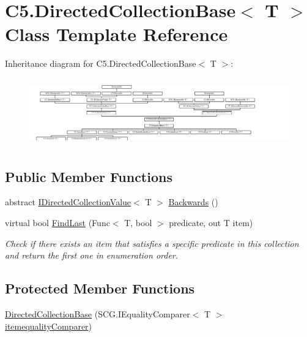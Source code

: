 \hypertarget{class_c5_1_1_directed_collection_base}{}\section{C5.\+Directed\+Collection\+Base$<$ T $>$ Class Template Reference}
\label{class_c5_1_1_directed_collection_base}


 


Inheritance diagram for C5.\+Directed\+Collection\+Base$<$ T $>$\+:\begin{figure}[H]
\begin{center}
\leavevmode
\includegraphics[height=2.957747cm]{class_c5_1_1_directed_collection_base}
\end{center}
\end{figure}
\subsection*{Public Member Functions}
\begin{DoxyCompactItemize}
\item 
abstract \hyperlink{interface_c5_1_1_i_directed_collection_value}{I\+Directed\+Collection\+Value}$<$ T $>$ \hyperlink{class_c5_1_1_directed_collection_base_a9a4c7d6571ff7d78ea5adcb0d8264ff1}{Backwards} ()
\item 
virtual bool \hyperlink{class_c5_1_1_directed_collection_base_a5dd3482ac69a6ef10092748c9953785b}{Find\+Last} (Func$<$ T, bool $>$ predicate, out T item)
\begin{DoxyCompactList}\small\item\em Check if there exists an item that satisfies a specific predicate in this collection and return the first one in enumeration order. \end{DoxyCompactList}\end{DoxyCompactItemize}
\subsection*{Protected Member Functions}
\begin{DoxyCompactItemize}
\item 
\hyperlink{class_c5_1_1_directed_collection_base_a59bb822bc2fdd8ba04cd778d958323d4}{Directed\+Collection\+Base} (S\+C\+G.\+I\+Equality\+Comparer$<$ T $>$ \hyperlink{class_c5_1_1_collection_base_a95e343400be0e8f3f8d6310f1aaf2cc6}{itemequality\+Comparer})
\end{DoxyCompactItemize}
